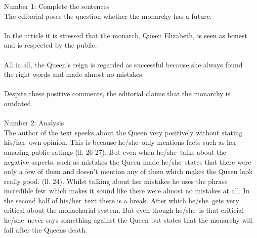 \documentclass[a4paper,12pt]{report}
\newcommand{\ap}[0]{he/she\ }
\newcommand{\apx}[0]{his/her\ }
\begin{document}
	\noindent
	\Large Number 1: Complete the sentences
	\\[0.5cm]
	\large
	The editorial poses the question whether the monarchy has a future.\\\\
	In the article it is stressed that the monarch, Queen Elizabeth, is seen as honest and is respected by the public. \\\\
	All in all, the Queen's reign is regarded as successful because she always found the right words and made almost no mistakes. \\\\
	Despite these positive comments, the editorial claims that the monarchy is outdated.\\\\
	\Large Number 2: Analysis
	\\[0.5cm]
	\large
	The author of the text speeks about the Queen very positively without stating \apx own opinion.
	This is because \ap only mentions facts such as her amazing public ratings (ll. 26-27).
	But even when \ap talks about the negative aspects, such as mistakes the Queen made \ap states that there were only a few of them and doesn't mention any of them which makes the Queen look really good. (ll. 24).
	Whilst talking about her mistakes he uses the phrase \dq incredible few\dq\ which makes it sound like there were almost no mistakes at all.
	In the second half of \apx text there is a break.
	After which \ap gets very critical about the monacharial system.
	But even though \ap is that criticial \ap never says something against the Queen but states that the monarchy will fail after the Queens death.
\end{document}
